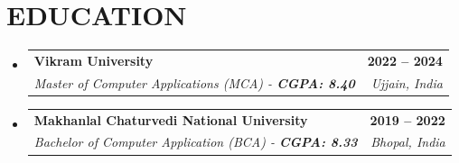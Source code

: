 \documentclass[letterpaper,11pt]{article}
\makeatletter
\newcommand{\resumeSubheading}[4]{
  \vspace{-2pt}\item
  \begin{tabular*}{1.0\textwidth}[t]{l@{\extracolsep{\fill}}r}
    \textbf{\large#1} & \textbf{\small #2} \\
    \textit{\large#3} & \textit{\small #4} \\
  \end{tabular*}\vspace{-7pt}
}
\newcommand{\resumeSubHeadingListStart}{\begin{itemize}[leftmargin=0.0in, label={}]}
\newcommand{\resumeSubHeadingListEnd}{\end{itemize}}
\makeatother
\begin{document}
\section{EDUCATION}
\resumeSubHeadingListStart
  \resumeSubheading
    {Vikram University}{2022 -- 2024}
    {Master of Computer Applications (MCA) - \textbf{CGPA: 8.40}}{Ujjain, India}

  \resumeSubheading
    {Makhanlal Chaturvedi National University}{2019 -- 2022}
    {Bachelor of Computer Application (BCA) - \textbf{CGPA: 8.33}}{Bhopal, India}
\resumeSubHeadingListEnd
\end{document}
